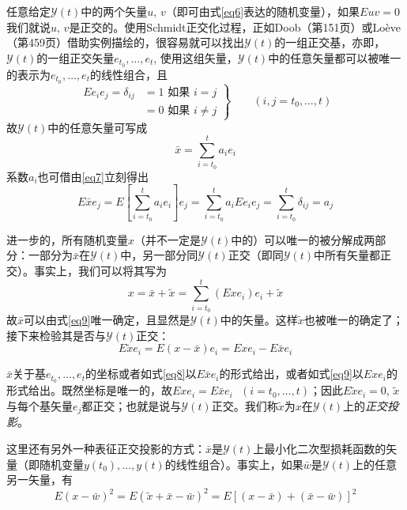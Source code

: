 \documentclass[UTF8,adobefonts]{ctexart}
\begin{document}
任意给定$\mathbf{\mathcal{Y}}(t)$中的两个矢量$u\text{, }v$（即可由式\ref{eq6}表达的随机变量），如果$Euv=0$我们就说$u\text{, }v$是正交的。使用Schmidt正交化过程，正如Doob\cite{rf15}（第151页）或Lo\`eve\cite{rf16}（第459页）借助实例描绘的，很容易就可以找出$\mathbf{\mathcal{Y}}(t)$的一组正交基，亦即，$\mathbf{\mathcal{Y}}(t)$的一组正交矢量$e_{t_0},\dotsc,e_t$, 使用这组矢量，$\mathbf{\mathcal{Y}}(t)$中的任意矢量都可以被唯一的表示为$e_{t_0},\dotsc,e_t$的线性组合，且
\begin{equation}
\label{eq7}
\left.\begin{aligned}
Ee_ie_j=\delta_{ij}&=1 \text{ 如果 } i = j\\
&=0 \text{ 如果 } i \ne j
\end{aligned}\right\}
\qquad (i,j=t_0,\dotsc,t)
\end{equation}
故$\mathbf{\mathcal{Y}}(t)$中的任意矢量可写成
\begin{equation*}
\bar{x}=\sum^t_{i=t_0}a_ie_i
\end{equation*}
系数$a_i$也可借由\ref{eq7}立刻得出
\begin{equation}
\label{eq8}
E\bar{x}e_j=E[\sum^t_{i=t_0}a_ie_i]e_j=\sum^t_{i=t_0}a_iEe_ie_j=\sum^t_{i=t_0}\delta_{ij}=a_j
\end{equation}

进一步的，所有随机变量$x$（并不一定是$\mathbf{\mathcal{Y}}(t)$中的）可以唯一的被分解成两部分：一部分为$\bar{x}$在$\mathbf{\mathcal{Y}}(t)$中，另一部分同$\mathbf{\mathcal{Y}}(t)$正交（即同$\mathbf{\mathcal{Y}}(t)$中所有矢量都正交）。事实上，我们可以将其写为
\begin{equation}
\label{eq9}
x=\bar{x}+\tilde{x}=\sum^t_{i=t_0}(Exe_i)e_i+\tilde{x}
\end{equation}
故$\bar{x}$可以由式\ref{eq9}唯一确定，且显然是$\mathbf{\mathcal{Y}}(t)$中的矢量。这样$\tilde{x}$也被唯一的确定了；接下来检验其是否与$\mathbf{\mathcal{Y}}(t)$正交：
\begin{equation*}
E\tilde{x}e_i=E(x-\bar{x})e_i=Exe_i-E\bar{x}e_i
\end{equation*}

$\bar{x}$关于基$e_{t_0},\dotsc,e_t$的坐标或者如式\ref{eq8}以$E\bar{x}e_i$的形式给出，或者如式\ref{eq9}以$Exe_i$的形式给出。既然坐标是唯一的，故$Exe_i=E\bar{x}e_i\text{ }(i=t_0,\dotsc,t)$；因此$E\tilde{x}e_i=0$, $\tilde{x}$与每个基矢量$e_j$都正交；也就是说与$\mathbf{\mathcal{Y}}(t)$正交。我们称$\tilde{x}$为$x$在$\mathbf{\mathcal{Y}}(t)$上的\emph{正交投影}。

这里还有另外一种表征正交投影的方式：$\bar{x}$是$\mathbf{\mathcal{Y}}(t)$上最小化二次型损耗函数的矢量（即随机变量$y(t_0),\dotsc,y(t)$的线性组合）。事实上，如果$\bar{w}$是$\mathbf{\mathcal{Y}}(t)$上的任意另一矢量，有
\begin{equation*}
E(x-\bar{w})^2=E(\tilde{x}+\bar{x}-\bar{w})^2=E[(x-\bar{x})+(\bar{x}-\bar{w})]^2
\end{equation*}
\end{document}
